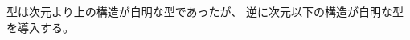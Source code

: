 \documentclass[index]{subfiles}
\begin{document}

型は次元より上の構造が自明な型であったが、
逆に次元以下の構造が自明な型を導入する。






\end{document}
